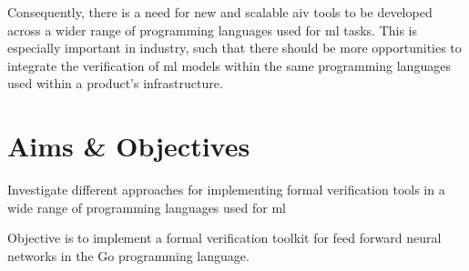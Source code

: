 Consequently, there is a need for new and scalable
\gls{aiv} tools to be developed across a wider range of programming languages used for \gls{ml} tasks. 
This is especially important in industry, such that there should be more opportunities to
integrate the verification of \gls{ml} models within the same programming languages used within
a product's infrastructure.



\section{Aims \& Objectives}

Investigate different approaches for implementing formal verification tools in a wide range of programming 
languages used for \gls{ml}

Objective is to implement a formal verification toolkit for feed forward neural networks in the Go programming language.
